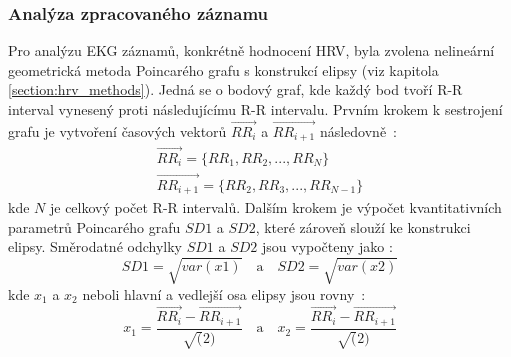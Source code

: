 \subsubsection{Analýza zpracovaného záznamu}
\label{section:analysis}
Pro analýzu EKG záznamů, konkrétně hodnocení HRV, byla zvolena nelineární
geometrická metoda Poincarého grafu s konstrukcí elipsy (viz kapitola
\ref{section:hrv_methods}). Jedná se o bodový graf, kde každý bod tvoří R-R
interval vynesený proti následujícímu R-R intervalu. Prvním krokem k sestrojení
grafu je vytvoření časových vektorů $\overrightarrow{RR_i}$ a
$\overrightarrow{RR_{i+1}}$ následovně~\cite{Mazhar2007}:
\begin{gather}
    \overrightarrow{RR_i} = \{RR_1, RR_2,...,RR_{N}\} \\
    \overrightarrow{RR_{i+1}} = \{RR_2, RR_3,...,RR_{N-1}\}
\end{gather}
kde $N$ je celkový počet R-R intervalů. Dalším krokem je výpočet kvantitativních
parametrů Poincarého grafu $SD1$ a $SD2$, které zároveň slouží ke konstrukci
elipsy. Směrodatné odchylky $SD1$ a $SD2$ jsou vypočteny jako \cite{Mazhar2007}:
\begin{equation}
    SD1 = \sqrt{var(x1)}
    \quad \textrm{a} \quad
    SD2 = \sqrt{var(x2)}
\end{equation}
kde $x_1$ a $x_2$ neboli hlavní a vedlejší osa elipsy jsou
rovny~\cite{Mazhar2007}:
\begin{equation}
    x_1 = \frac{\overrightarrow{RR_i}-\overrightarrow{RR_{i+1}}}{\sqrt(2)}
    \quad \textrm{a} \quad
    x_2 = \frac{\overrightarrow{RR_i}-\overrightarrow{RR_{i+1}}}{\sqrt(2)}
\end{equation}

